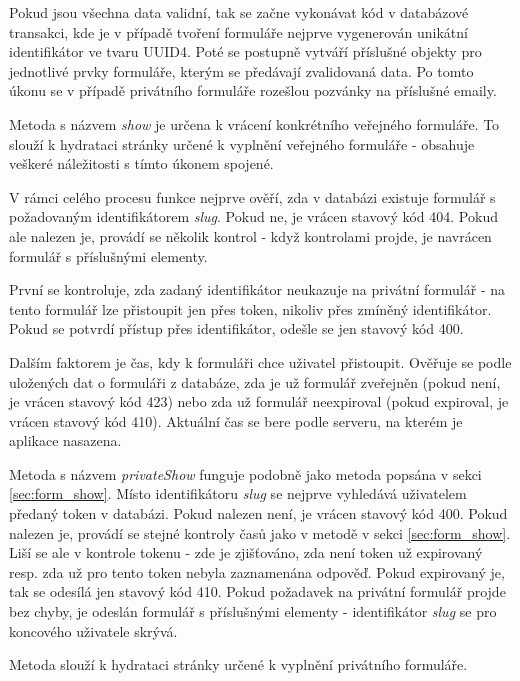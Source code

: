 			Pokud jsou všechna data validní, tak se začne vykonávat kód v databázové transakci, kde je v případě tvoření formuláře nejprve vygenerován unikátní identifikátor ve tvaru UUID4. Poté se postupně vytváří příslušné objekty pro jednotlivé prvky formuláře, kterým se předávají zvalidovaná data. Po tomto úkonu se v případě privátního formuláře rozešlou pozvánky na příslušné emaily.
			
			\label{sec:form_show}
			Metoda s názvem \textit{show} je určena k vrácení konkrétního veřejného formuláře. To slouží k hydrataci stránky určené k vyplnění veřejného formuláře - obsahuje veškeré náležitosti s tímto úkonem spojené.
			
			V rámci celého procesu funkce nejprve ověří, zda v databázi existuje formulář s požadovaným identifikátorem \textit{slug}. Pokud ne, je vrácen stavový kód 404. Pokud ale nalezen je, provádí se několik kontrol - když kontrolami projde, je navrácen formulář s příslušnými elementy.
			
			První se kontroluje, zda zadaný identifikátor neukazuje na privátní formulář - na tento formulář lze přistoupit jen přes token, nikoliv přes zmíněný identifikátor. Pokud se potvrdí přístup přes identifikátor, odešle se jen stavový kód 400.
			
			Dalším faktorem je čas, kdy k formuláři chce uživatel přistoupit. Ověřuje se podle uložených dat o formuláři z databáze, zda je už formulář zveřejněn (pokud není, je vrácen stavový kód 423) nebo zda už formulář neexpiroval (pokud expiroval, je vrácen stavový kód 410). Aktuální čas se bere podle serveru, na kterém je aplikace nasazena.
			
			Metoda s názvem \textit{privateShow} funguje podobně jako metoda popsána v sekci \ref{sec:form_show}. Místo identifikátoru \textit{slug} se nejprve vyhledává uživatelem předaný token v databázi. Pokud nalezen není, je vrácen stavový kód 400. Pokud nalezen je, provádí se stejné kontroly časů jako v metodě v sekci \ref{sec:form_show}. Liší se ale v kontrole tokenu - zde je zjišťováno, zda není token už expirovaný resp. zda už pro tento token nebyla zaznamenána odpověď. Pokud expirovaný je, tak se odesílá jen stavový kód 410. Pokud požadavek na privátní formulář projde bez chyby, je odeslán formulář s příslušnými elementy - identifikátor \textit{slug} se pro koncového uživatele skrývá.
			
			Metoda slouží k hydrataci stránky určené k vyplnění privátního formuláře.
			

